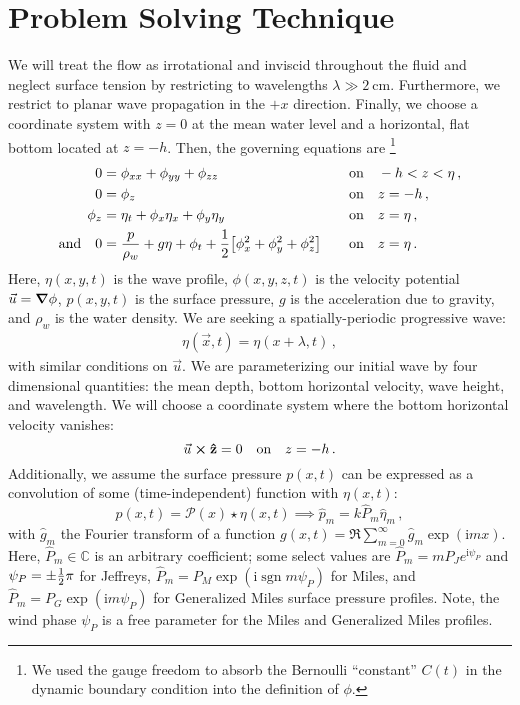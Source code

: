 \documentclass{jfm}
\let\Oldsection\section
\renewcommand{\section}{\FloatBarrier\Oldsection}
\newcommand{\GenP}{\hat{P}_m}
\DeclareMathOperator{\sgn}{sgn}
\newcommand{\im}{\mathrm{i}}
\begin{document}
\section{Problem Solving Technique}
We will treat the flow as irrotational and inviscid throughout the
fluid and neglect surface tension by restricting to wavelengths $\lambda
\gg \SI{2}{\centi\meter}$.
Furthermore, we restrict to planar wave propagation in the $+x$
direction.
Finally, we choose a coordinate system with $z=0$ at the mean water level and
a horizontal, flat bottom located at $z=-h$.
Then, the governing equations are%
\footnote{
  We used the gauge freedom to absorb the Bernoulli ``constant'' $C(t)$
  in the dynamic boundary condition into the definition of $\phi$.
}
\begin{alignat}{2}
  0 &= \phi_{xx} + \phi_{yy} + \phi_{zz} &&\qq{on}
  -h < z < \eta \,, \label{eq:laplace}\\
  0 &= \phi_{z} &&\qq{on} z=-h \,, \label{eq:bottom_bc}\\
  \phi_{z} &= \eta_{t} + \phi_{x} \eta_{x} +
  \phi_{y} \eta_{y} &&\qq{on} z = \eta \,, \label{eq:kinematic_bc}\\
  \qq*{and} 0 &= \frac{p}{\rho_w} + g\eta + \phi_{t} +
  \frac{1}{2} \bqty{\phi_{x}^2 + \phi_{y}^2 + \phi_{z}^2} &&\qq{on} z=
  \eta \,. \label{eq:dynamic_bc}
\end{alignat}
Here, $\eta(x,y,t)$ is the wave profile, $\phi(x,y,z,t)$ is the velocity
potential $\vec{u} = \grad{\phi}$, $p(x,y,t)$ is the surface pressure,
$g$ is the acceleration due to gravity, and $\rho_w$ is the water
density.
We are seeking a spatially-periodic progressive wave:
\begin{gather}
  \eta(\vec{x},t) = \eta(x + \lambda, t) \,,
\end{gather}
with similar conditions on $\vec{u}$.
We are parameterizing our initial wave by four dimensional quantities:
the mean depth, bottom horizontal velocity, wave height, and wavelength.
We will choose a coordinate system where the bottom horizontal velocity
vanishes:
\begin{equation}
  \vec{u}\cross \vu{z} = 0 \qq{on} z=-h \,. \label{eq:bot_bc_horz}
\end{equation}
Additionally, we assume the surface pressure $p(x,t)$ can be expressed
as a convolution of some (time-independent) function with $\eta(x,t)$:
\begin{equation}
  p(x,t) = \mathcal{P}(x) \star \eta(x,t) \implies \hat{p}_m = k \GenP
    \hat{\eta}_m \,,
\end{equation}
with $\hat{g}_m$ the Fourier transform of a function $g(x,t) =
\Re{\sum_{m=0}^{\infty} \hat{g}_m \exp(\im m x)}$.
Here, $\GenP \in \mathbb{C}$ is an arbitrary coefficient; some select
values are
$\GenP = m P_J e^{\im \psi_P}$ and $\psi_P = \pm {\textstyle\frac{1}{2}} \pi$
for Jeffreys, $\GenP = P_M \exp(\im \sgn{m} \psi_P)$ for Miles, and
$\GenP = P_G \exp(\im m \psi_P)$ for Generalized Miles surface pressure
profiles.
Note, the wind phase $\psi_P$ is a free parameter for the Miles and
Generalized Miles profiles.
\end{document}
